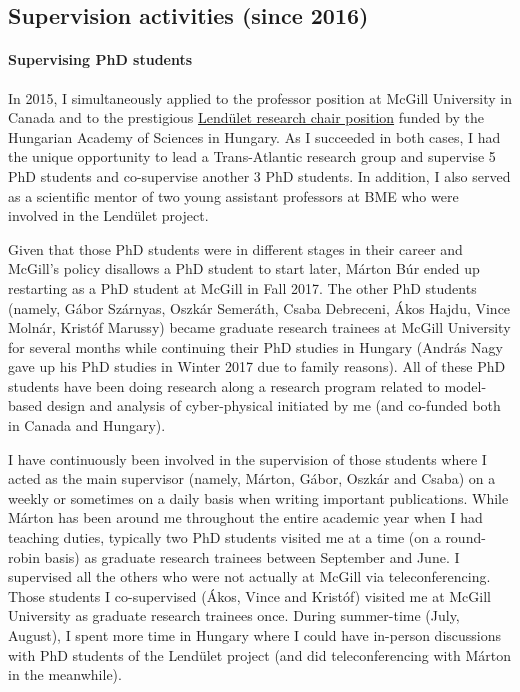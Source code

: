 \documentclass[a4paper,11pt]{report}
\begin{document}
\subsection{Supervision activities (since 2016)}

\paragraph{Supervising PhD students}
In 2015, I simultaneously applied to the professor position at McGill University in Canada and to the prestigious 
\href{https://mta.hu/lendulet}{Lendület research chair position} funded by the Hungarian Academy of Sciences in Hungary. 
As I succeeded in both cases, I had the unique opportunity to lead a Trans-Atlantic research group and supervise 5 PhD 
students and co-supervise another 3 PhD students.  In addition, I also served as a scientific mentor of two young assistant 
professors at BME who were involved in the Lendület project.

Given that those PhD students were in different stages in their career and McGill's policy disallows a PhD student to start 
later, Márton Búr ended up restarting as a PhD student at McGill in Fall 2017. The other PhD students (namely, Gábor 
Szárnyas, Oszkár Semeráth, Csaba Debreceni, Ákos Hajdu, Vince Molnár, Kristóf Marussy) became graduate research 
trainees at McGill University for several months while continuing their PhD studies in Hungary (András Nagy gave up his PhD 
studies in Winter 2017 due to family reasons). All of these PhD students have been doing research along a research program 
related to model-based design and analysis of cyber-physical initiated by me (and co-funded both in Canada and Hungary). 

I have continuously been involved in the supervision of those students where I acted as the main supervisor (namely, 
Márton, Gábor, Oszkár and Csaba) on a weekly or sometimes on a daily basis when writing important publications. While 
Márton has been around me throughout the entire academic year when I had teaching duties, typically two PhD students 
visited me at a time (on a round-robin basis) as graduate research trainees between September and June. I supervised all the others who were not actually at McGill via 
teleconferencing. Those students I co-supervised (Ákos, Vince and Kristóf) visited me at McGill University as graduate 
research trainees once. During summer-time (July, August), I spent more time in Hungary where I could have in-person 
discussions with PhD students of the Lendület project (and did teleconferencing with Márton in the meanwhile). 
\end{document}
